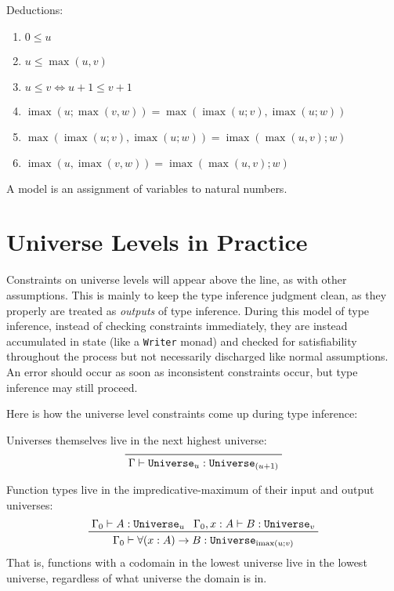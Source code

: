 \documentclass[11pt, twoside, reqno]{book}
\DeclareMathOperator{\imax}{imax}
\begin{document}
Deductions:
\label{alg-uni-laws-more}
\begin{enumerate}
\item $0 \le u$
\item $u \le \max(u, v)$
\item $u \le v \iff u+1 \le v+1$
\item $\imax(u; \max(v, w)) = \max(\imax(u; v), \imax(u; w))$
\item $\max(\imax(u; v), \imax(u; w)) = \imax(\max(u, v); w)$
\item $\imax(u, \imax(v, w)) = \imax(\max(u, v); w)$
\end{enumerate}

A model is an assignment of variables to natural numbers.

\section{Universe Levels in Practice}
\label{uni-lvl-prac}

Constraints on universe levels will appear above the line, as with other assumptions.
This is mainly to keep the type inference judgment clean, as they properly are treated as \emph{outputs} of type inference.
During this model of type inference, instead of checking constraints immediately, they are instead accumulated in state (like a \verb`Writer` monad) and checked for satisfiability throughout the process but not necessarily discharged like normal assumptions.
An error should occur as soon as inconsistent constraints occur, but type inference may still proceed.

Here is how the universe level constraints come up during type inference:

Universes themselves live in the next highest universe:
\begin{displaymath}
\prftree{\Gamma \vdash \texttt{Universe}_u : \texttt{Universe}_{(u+1)}}
\end{displaymath}

Function types live in the impredicative-maximum of their input and output universes:
\begin{displaymath}
\prftree
  {\Gamma_0 \vdash A : \texttt{Universe}_u}
  {\Gamma_0, x : A \vdash B : \texttt{Universe}_v}
  {\Gamma_0 \vdash \forall (x : A) \to B : \texttt{Universe}_{\imax(u; v)}}
\end{displaymath}
That is, functions with a codomain in the lowest universe live in the lowest universe, regardless of what universe the domain is in.
\end{document}

